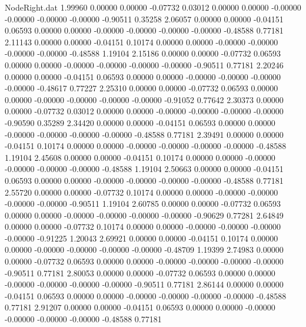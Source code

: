 \begin{filecontents}{NodeRight.dat}
   1.99960    0.00000    0.00000    -0.07732    0.03012    0.00000    0.00000   -0.00000   -0.00000   -0.00000   -0.00000   -0.90511    0.35258
   2.06057    0.00000    0.00000    -0.04151    0.06593    0.00000    0.00000   -0.00000   -0.00000   -0.00000   -0.00000   -0.48588    0.77181
   2.11143    0.00000    0.00000    -0.04151    0.10174    0.00000    0.00000   -0.00000   -0.00000   -0.00000   -0.00000   -0.48588    1.19104
   2.15186    0.00000    0.00000    -0.07732    0.06593    0.00000    0.00000   -0.00000   -0.00000   -0.00000   -0.00000   -0.90511    0.77181
   2.20246    0.00000    0.00000    -0.04151    0.06593    0.00000    0.00000   -0.00000   -0.00000   -0.00000   -0.00000   -0.48617    0.77227
   2.25310    0.00000    0.00000    -0.07732    0.06593    0.00000    0.00000   -0.00000   -0.00000   -0.00000   -0.00000   -0.91052    0.77642
   2.30373    0.00000    0.00000    -0.07732    0.03012    0.00000    0.00000   -0.00000   -0.00000   -0.00000   -0.00000   -0.90590    0.35289
   2.34420    0.00000    0.00000    -0.04151    0.06593    0.00000    0.00000   -0.00000   -0.00000   -0.00000   -0.00000   -0.48588    0.77181
   2.39491    0.00000    0.00000    -0.04151    0.10174    0.00000    0.00000   -0.00000   -0.00000   -0.00000   -0.00000   -0.48588    1.19104
   2.45608    0.00000    0.00000    -0.04151    0.10174    0.00000    0.00000   -0.00000   -0.00000   -0.00000   -0.00000   -0.48588    1.19104
   2.50663    0.00000    0.00000    -0.04151    0.06593    0.00000    0.00000   -0.00000   -0.00000   -0.00000   -0.00000   -0.48588    0.77181
   2.55720    0.00000    0.00000    -0.07732    0.10174    0.00000    0.00000   -0.00000   -0.00000   -0.00000   -0.00000   -0.90511    1.19104
   2.60785    0.00000    0.00000    -0.07732    0.06593    0.00000    0.00000   -0.00000   -0.00000   -0.00000   -0.00000   -0.90629    0.77281
   2.64849    0.00000    0.00000    -0.07732    0.10174    0.00000    0.00000   -0.00000   -0.00000   -0.00000   -0.00000   -0.91225    1.20043
   2.69921    0.00000    0.00000    -0.04151    0.10174    0.00000    0.00000   -0.00000   -0.00000   -0.00000   -0.00000   -0.48709    1.19399
   2.74983    0.00000    0.00000    -0.07732    0.06593    0.00000    0.00000   -0.00000   -0.00000   -0.00000   -0.00000   -0.90511    0.77181
   2.80053    0.00000    0.00000    -0.07732    0.06593    0.00000    0.00000   -0.00000   -0.00000   -0.00000   -0.00000   -0.90511    0.77181
   2.86144    0.00000    0.00000    -0.04151    0.06593    0.00000    0.00000   -0.00000   -0.00000   -0.00000   -0.00000   -0.48588    0.77181
   2.91207    0.00000    0.00000    -0.04151    0.06593    0.00000    0.00000   -0.00000   -0.00000   -0.00000   -0.00000   -0.48588    0.77181

\end{filecontents}

